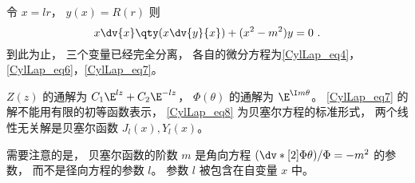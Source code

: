 令 $x = lr$，   $y(x) = R(r)$ 则
\begin{equation}\label{CylLap_eq8} 
x \dv{x} \qty(x\dv{y}{x}) + (x^2 - m^2)y = 0~.
\end{equation}
到此为止， 三个变量已经完全分离， 各自的微分方程为\autoref{CylLap_eq4}， \autoref{CylLap_eq6}，\autoref{CylLap_eq7}。

$Z(z)$ 的通解为 $C_1\E^{lz} + C_2 \E^{-lz}$，   $\Phi(\theta)$ 的通解为 $\E^{\I m\theta}$。   \autoref{CylLap_eq7} 的解不能用有限的初等函数表示， \autoref{CylLap_eq8} 为贝塞尔方程的标准形式， 两个线性无关解是贝塞尔函数 $J_l(x), Y_l(x)$。

需要注意的是， 贝塞尔函数的阶数 $m$ 是角向方程 $(\dv*[2]{\Phi}{\theta})/\Phi = -m^2$ 的参数， 而不是径向方程的参数 $l$。 参数 $l$ 被包含在自变量 $x$ 中。
